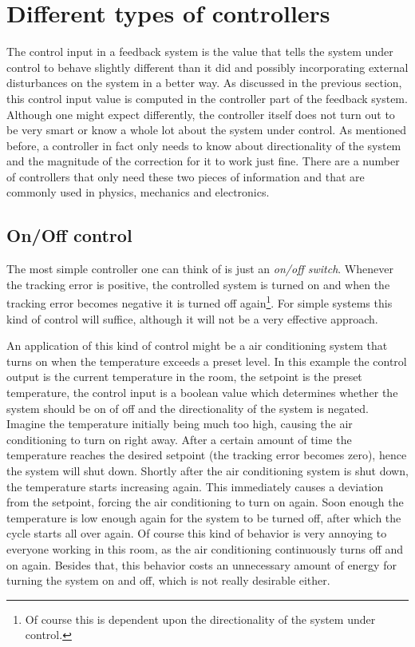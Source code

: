 \section{Different types of controllers}
The control input in a feedback system is the value that tells the system under control to behave slightly different than it did and possibly incorporating external disturbances on the system in a better way. As discussed in the previous section, this control input value is computed in the controller part of the feedback system. Although one might expect differently, the controller itself does not turn out to be very smart or know a whole lot about the system under control. As mentioned before, a controller in fact only needs to know about directionality of the system and the magnitude of the correction for it to work just fine. There are a number of controllers that only need these two pieces of information and that are commonly used in physics, mechanics and electronics.

\subsection{On/Off control}
The most simple controller one can think of is just an \textit{on/off switch}. Whenever the tracking error is positive, the controlled system is turned on and when the tracking error becomes negative it is turned off again\footnote{Of course this is dependent upon the directionality of the system under control.}. For simple systems this kind of control will suffice, although it will not be a very effective approach.

An application of this kind of control might be a air conditioning system that turns on when the temperature exceeds a preset level. In this example the control output is the current temperature in the room, the setpoint is the preset temperature, the control input is a boolean value which determines whether the system should be on of off and the directionality of the system is negated. Imagine the temperature initially being much too high, causing the air conditioning to turn on right away. After a certain amount of time the temperature reaches the desired setpoint (the tracking error becomes zero), hence the system will shut down. Shortly after the air conditioning system is shut down, the temperature starts increasing again. This immediately causes a deviation from the setpoint, forcing the air conditioning to turn on again. Soon enough the temperature is low enough again for the system to be turned off, after which the cycle starts all over again. Of course this kind of behavior is very annoying to everyone working in this room, as the air conditioning continuously turns off and on again. Besides that, this behavior costs an unnecessary amount of energy for turning the system on and off, which is not really desirable either.

